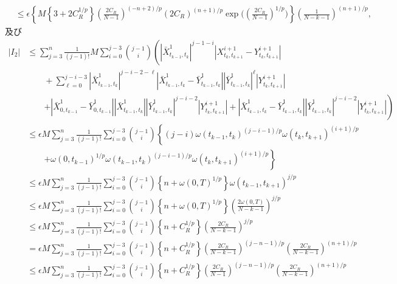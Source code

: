 \begin{prf}
\begin{description}
\begin{align}
					&\leq \epsilon \left\{ M \left\{ 3 + 2 C_R^{1/p} \right\} \left( \frac{2C_R}{N-1} \right)^{(-n+2)/p}
						\left( 2C_R \right)^{(n+1)/p} \operatorname{exp}\Biggl(\left( \frac{2C_R}{N-1} \right)^{1/p}\Biggr)\right\}
						\left( \frac{1}{N-k-1} \right)^{(n+1)/p},
				\end{align}
				及び
				\begin{align}
					|I_2| &\leq \sum_{j=3}^n \frac{1}{(j-1)!} M \sum_{i=0}^{j-3} \binom{j-1}{i} \left( \left|\bar{X}^1_{t_{k-1},t_k}\right|^{j-1-i} \left|X^{i+1}_{t_k,t_{k+1}} - Y^{i+1}_{t_k,t_{k+1}}\right| \right. \\
						&\qquad + \sum_{\ell=0}^{j-i-3} \left|\bar{X}^1_{t_{k-1},t_k}\right|^{j-i-2-\ell} \left|\bar{X}^1_{t_{k-1},t_k}-\bar{Y}^1_{t_{k-1},t_k}\right|\left|\bar{Y}^1_{t_{k-1},t_k}\right|^\ell \left|Y^{i+1}_{t_k,t_{k+1}}\right| \\
						&\qquad \left. + \left|\bar{X}^1_{0,t_{k-1}}-\bar{Y}^1_{0,t_{k-1}}\right| \left|\bar{X}^1_{t_{k-1},t_k}\right|\left|\bar{Y}^1_{t_{k-1},t_k}\right|^{j-i-2} \left|Y^{i+1}_{t_k,t_{k+1}}\right|
						+ \left|\bar{X}^1_{t_{k-1},t_k}-\bar{Y}^1_{t_{k-1},t_k}\right|\left|\bar{Y}^1_{t_{k-1},t_k}\right|^{j-i-2} \left|Y^{i+1}_{t_k,t_{k+1}}\right| \right) \\
					&\leq \epsilon M \sum_{j=3}^n \frac{1}{(j-1)!} \sum_{i=0}^{j-3} \binom{j-1}{i} \left\{ (j-i) \omega(t_{k-1},t_k)^{(j-i-1)/p} \omega(t_k,t_{k+1})^{(i+1)/p} \right. \\
						&\qquad \left. + \omega(0,t_{k-1})^{1/p} \omega(t_{k-1},t_k)^{(j-i-1)/p} \omega(t_k,t_{k+1})^{(i+1)/p} \right\} \\
					&\leq \epsilon M \sum_{j=3}^n \frac{1}{(j-1)!} \sum_{i=0}^{j-3} \binom{j-1}{i} \left\{ n + \omega(0,T)^{1/p} \right\} \omega(t_{k-1},t_{k+1})^{j/p} \\
					&\leq \epsilon M \sum_{j=3}^n \frac{1}{(j-1)!} \sum_{i=0}^{j-3} \binom{j-1}{i} \left\{ n + \omega(0,T)^{1/p} \right\} \left( \frac{2\omega(0,T)}{N-k-1} \right)^{j/p} \\
					&\leq \epsilon M \sum_{j=3}^n \frac{1}{(j-1)!} \sum_{i=0}^{j-3} \binom{j-1}{i} \left\{ n + C_R^{1/p} \right\} \left( \frac{2C_R}{N-k-1} \right)^{j/p} \\
					&= \epsilon M \sum_{j=3}^n \frac{1}{(j-1)!} \sum_{i=0}^{j-3} \binom{j-1}{i} \left\{ n + C_R^{1/p} \right\} \left( \frac{2C_R}{N-k-1} \right)^{(j-n-1)/p} \left( \frac{2C_R}{N-k-1} \right)^{(n+1)/p} \\
					&\leq \epsilon M \sum_{j=3}^n \frac{1}{(j-1)!} \sum_{i=0}^{j-3} \binom{j-1}{i} \left\{ n + C_R^{1/p} \right\} \left( \frac{2C_R}{N-1} \right)^{(j-n-1)/p} \left( \frac{2C_R}{N-k-1} \right)^{(n+1)/p} \\

\end{align}
\end{description}
\end{prf}
